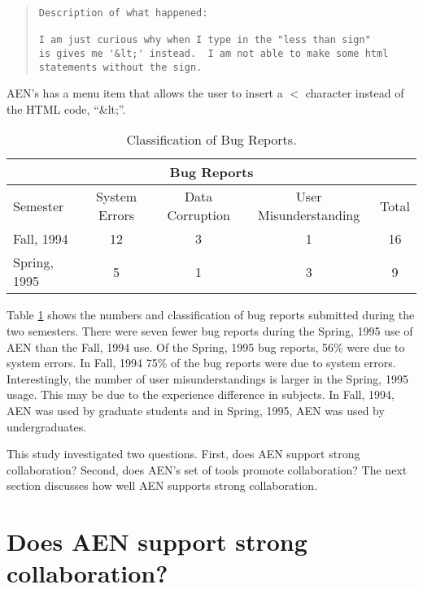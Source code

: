 
\small
\begin{quote}
  \begin{verbatim}
Description of what happened: 

I am just curious why when I type in the "less than sign" 
is gives me '&lt;' instead.  I am not able to make some html 
statements without the sign.
  \end{verbatim}
\end{quote}
\normalsize


AEN's has a menu item that allows the user to insert a $<$ character instead
of the HTML code, ``\&lt;''.

\small
\begin{table}
  \begin{center}
    \caption{Classification of Bug Reports.}
    \begin{tabular}{|l|c|c|c||c|}
      \hline
      \multicolumn{5}{|c|}{\rule[-3mm]{0mm}{8mm}\bf Bug Reports}\\ \hline
      Semester&System Errors&Data Corruption&User Misunderstanding&Total\\ \hline
      \hline
      Fall, 1994&12&3&1&16\\ \hline
      Spring, 1995&5&1&3&9\\\hline
    \end{tabular}
    \label{tab:bugs}
  \end{center}
\end{table}
\normalsize
    
Table \ref{tab:bugs} shows the numbers and classification of bug reports
submitted during the two semesters.  There were seven fewer bug reports
during the Spring, 1995 use of AEN than the Fall, 1994 use.  Of the Spring,
1995 bug reports, 56\% were due to system errors.  In Fall, 1994 75\% of
the bug reports were due to system errors.  Interestingly, the number of
user misunderstandings is larger in the Spring, 1995 usage.  This may be
due to the experience difference in subjects.  In Fall, 1994, AEN was used
by graduate students and in Spring, 1995, AEN was used
by undergraduates.  %

This study investigated two questions. First, does AEN support strong
collaboration? Second, does AEN's set of tools promote collaboration?  The
next section discusses how well AEN supports strong collaboration.

\section{Does AEN support strong collaboration?}
\label{sec:AEN-supports}

